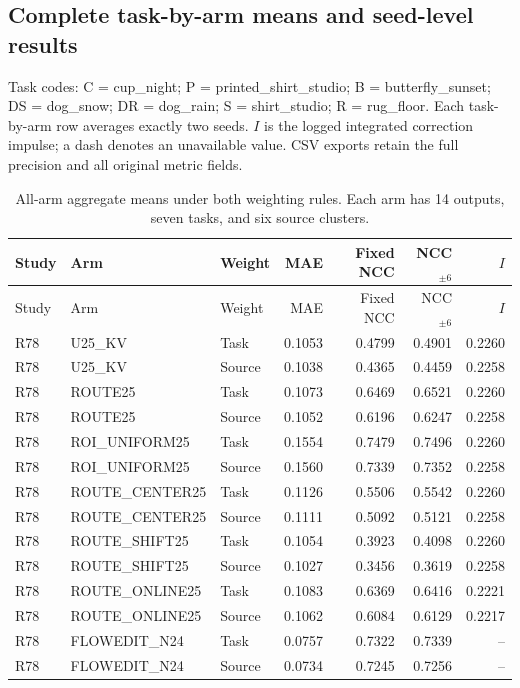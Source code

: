 \subsection{Complete task-by-arm means and seed-level results}

Task codes: C = cup\_night; P = printed\_shirt\_studio; B = butterfly\_sunset; DS = dog\_snow; DR = dog\_rain; S = shirt\_studio; R = rug\_floor. Each task-by-arm row averages exactly two seeds. $I$ is the logged integrated correction impulse; a dash denotes an unavailable value. CSV exports retain the full precision and all original metric fields.

\begingroup\scriptsize\setlength{\tabcolsep}{2pt}
\begin{longtable}{lp{.29\linewidth}lrrrr}
\caption{All-arm aggregate means under both weighting rules. Each arm has 14 outputs, seven tasks, and six source clusters.}\\
\hline
Study & Arm & Weight & MAE & Fixed NCC & NCC$_{\pm6}$ & $I$ \\ \hline
\endfirsthead
\hline
Study & Arm & Weight & MAE & Fixed NCC & NCC$_{\pm6}$ & $I$ \\ \hline
\endhead
R78 & U25\_KV & Task & 0.1053 & 0.4799 & 0.4901 & 0.2260 \\
R78 & U25\_KV & Source & 0.1038 & 0.4365 & 0.4459 & 0.2258 \\
R78 & ROUTE25 & Task & 0.1073 & 0.6469 & 0.6521 & 0.2260 \\
R78 & ROUTE25 & Source & 0.1052 & 0.6196 & 0.6247 & 0.2258 \\
R78 & ROI\_UNIFORM25 & Task & 0.1554 & 0.7479 & 0.7496 & 0.2260 \\
R78 & ROI\_UNIFORM25 & Source & 0.1560 & 0.7339 & 0.7352 & 0.2258 \\
R78 & ROUTE\_CENTER25 & Task & 0.1126 & 0.5506 & 0.5542 & 0.2260 \\
R78 & ROUTE\_CENTER25 & Source & 0.1111 & 0.5092 & 0.5121 & 0.2258 \\
R78 & ROUTE\_SHIFT25 & Task & 0.1054 & 0.3923 & 0.4098 & 0.2260 \\
R78 & ROUTE\_SHIFT25 & Source & 0.1027 & 0.3456 & 0.3619 & 0.2258 \\
R78 & ROUTE\_ONLINE25 & Task & 0.1083 & 0.6369 & 0.6416 & 0.2221 \\
R78 & ROUTE\_ONLINE25 & Source & 0.1062 & 0.6084 & 0.6129 & 0.2217 \\
R78 & FLOWEDIT\_N24 & Task & 0.0757 & 0.7322 & 0.7339 & -- \\
R78 & FLOWEDIT\_N24 & Source & 0.0734 & 0.7245 & 0.7256 & -- \\

\end{longtable}
